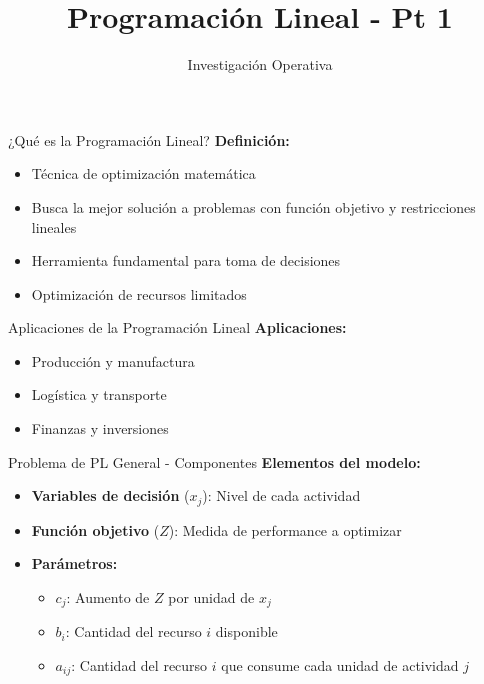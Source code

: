 \documentclass{beamer}
\title{\Huge\textbf{Programación Lineal - Pt 1}}
\author{Investigación Operativa}
\date{}
\begin{document}
\begin{frame}
    \titlepage
\end{frame}

\begin{frame}{¿Qué es la Programación Lineal?}
    \textbf{Definición:}
    \begin{itemize}
        \item Técnica de optimización matemática
        \item Busca la mejor solución a problemas con función objetivo y restricciones lineales
        \item Herramienta fundamental para toma de decisiones
        \item Optimización de recursos limitados
    \end{itemize}
\end{frame}

\begin{frame}{Aplicaciones de la Programación Lineal}
    \textbf{Aplicaciones:}
    \begin{itemize}
        \item[{\makebox[1em][c]{\textcolor{black}{\faIndustry}}}] Producción y manufactura
        \item[{\makebox[1em][c]{\textcolor{black}{\faTruck}}}] Logística y transporte
        \item[{\makebox[1em][c]{\textcolor{black}{\faMoneyBill}}}] Finanzas y inversiones
    \end{itemize}
\end{frame}

\begin{frame}{Problema de PL General - Componentes}
    \textbf{Elementos del modelo:}
    \begin{itemize}
        \item<1-> \textbf{Variables de decisión} ($x_j$): Nivel de cada actividad
        \item<2-> \textbf{Función objetivo} ($Z$): Medida de performance a optimizar
        \item<3-> \textbf{Parámetros:}
        \begin{itemize}
            \item $c_j$: Aumento de $Z$ por unidad de $x_j$
            \item $b_i$: Cantidad del recurso $i$ disponible
            \item $a_{ij}$: Cantidad del recurso $i$ que consume cada unidad de actividad $j$
        \end{itemize}
    \end{itemize}
\end{frame}
\end{document}
